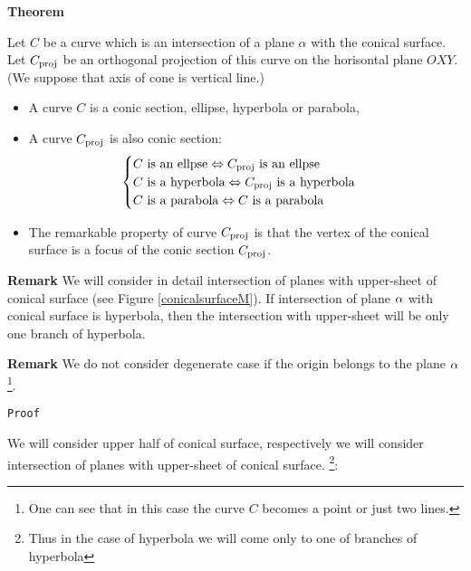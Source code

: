 \documentclass[12pt]{article}
\numberwithin{equation}{section}
\begin{document}
{\bf Theorem}
{\it 

Let $C$ be a curve which is an intersection of a plane $\alpha$ with
the conical  surface. Let $C_{\rm proj}$ be 
an orthogonal projection of
this curve on the horisontal plane $OXY$.
(We suppose that axis of cone is vertical line.)





\begin{itemize}

\item
   A curve $C$ is a conic section, ellipse, hyperbola or parabola,

\item

    A curve $C_{\rm proj}$ is also conic section:
                           \begin{equation*}
            \begin{cases}
   \hbox {$C$ is an ellpse}\Leftrightarrow\hbox 
 {$C_{\rm proj}$ is an ellpse}\cr
   \hbox {$C$ is a hyperbola}
 \Leftrightarrow\hbox {$C_{\rm proj}$ is a hyperbola}\cr
   \hbox {$C$ is a parabola}\Leftrightarrow
   \hbox {$C$ is a parabola}\cr
          \end{cases}
                           \end{equation*}

\item

    The remarkable property of curve $C_{\rm proj}$ is that
the vertex  of the conical surface is a focus of the conic
section  $C_{\rm proj}$.

\end{itemize}
}

{\bf Remark} We will consider in detail intersection
of planes with upper-sheet of conical surface (see Figure 
\eqref{conicalsurfaceM}). If intersection of
plane $\alpha$ with  conical
surface is hyperbola, then the intersection with
upper-sheet will be only one branch of hyperbola.



{\bf Remark}
We do not consider degenerate case
if the origin belongs to the plane 
$\alpha$\footnote{One can see that in this
case the curve $C$ becomes a point or just two lines.}.

\m

  {\tt Proof}

We will consider upper half of conical  surface,
respectively we will consider intersection
of planes with upper-sheet of conical surface.
\footnote{Thus in the case of hyperbola we will come
only to one of branches of hyperbola}:
\end{document}
